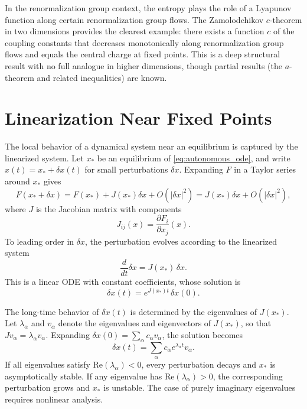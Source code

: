 \documentclass[11pt, twoside, openright]{book}
\theoremstyle{dotted}
\theoremstyle{definition}
\begin{document}
In the renormalization group context, the entropy plays the role of a Lyapunov
function along certain renormalization group flows. The Zamolodchikov $c$-theorem
in two dimensions provides the clearest example: there exists a function $c$ of the
coupling constants that decreases monotonically along renormalization group flows
and equals the central charge at fixed points. This is a deep structural result
with no full analogue in higher dimensions, though partial results (the $a$-theorem
and related inequalities) are known.

\section{Linearization Near Fixed Points}

The local behavior of a dynamical system near an equilibrium is captured by the
linearized system. Let $x_*$ be an equilibrium of \eqref{eq:autonomous_ode}, and
write $x(t) = x_* + \delta x(t)$ for small perturbations $\delta x$. Expanding
$F$ in a Taylor series around $x_*$ gives
\begin{equation}
  F(x_* + \delta x) = F(x_*) + J(x_*) \delta x + O(|\delta x|^2)
  = J(x_*) \delta x + O(|\delta x|^2),
\end{equation}
where $J$ is the Jacobian matrix with components
\begin{equation}
  J_{ij}(x) = \frac{\partial F_i}{\partial x_j}(x).
  \label{eq:jacobian}
\end{equation}
To leading order in $\delta x$, the perturbation evolves according to the
linearized system
\begin{equation}
  \frac{d}{dt} \delta x = J(x_*) \, \delta x.
  \label{eq:linearized}
\end{equation}
This is a linear ODE with constant coefficients, whose solution is
\begin{equation}
  \delta x(t) = e^{J(x_*) t} \, \delta x(0).
\end{equation}

The long-time behavior of $\delta x(t)$ is determined by the eigenvalues of
$J(x_*)$. Let $\lambda_\alpha$ and $v_\alpha$ denote the eigenvalues and
eigenvectors of $J(x_*)$, so that $J v_\alpha = \lambda_\alpha v_\alpha$.
Expanding $\delta x(0) = \sum_\alpha c_\alpha v_\alpha$, the solution becomes
\begin{equation}
  \delta x(t) = \sum_\alpha c_\alpha e^{\lambda_\alpha t} v_\alpha.
\end{equation}
If all eigenvalues satisfy $\text{Re}(\lambda_\alpha) < 0$, every perturbation
decays and $x_*$ is asymptotically stable. If any eigenvalue has
$\text{Re}(\lambda_\alpha) > 0$, the corresponding perturbation grows and $x_*$
is unstable. The case of purely imaginary eigenvalues requires nonlinear analysis.
\end{document}
